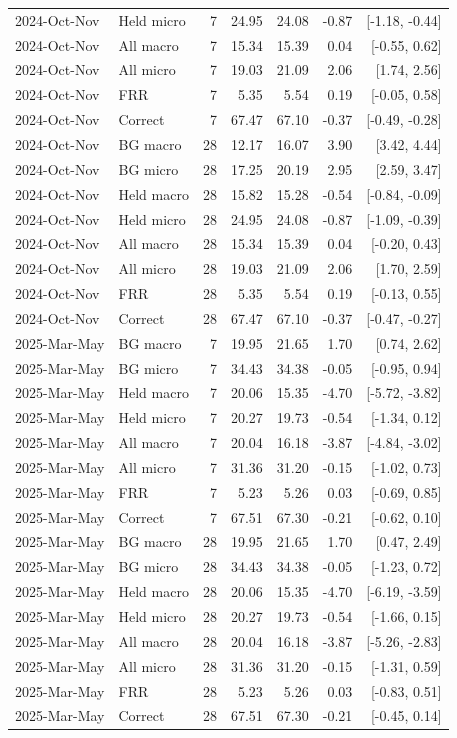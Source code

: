 \begin{longtable}{llrrrrr}
2024-Oct-Nov & Held micro & 7 & 24.95 & 24.08 & -0.87 & [-1.18, -0.44]\\
2024-Oct-Nov & All macro & 7 & 15.34 & 15.39 & 0.04 & [-0.55, 0.62]\\
2024-Oct-Nov & All micro & 7 & 19.03 & 21.09 & 2.06 & [1.74, 2.56]\\
2024-Oct-Nov & FRR & 7 & 5.35 & 5.54 & 0.19 & [-0.05, 0.58]\\
2024-Oct-Nov & Correct & 7 & 67.47 & 67.10 & -0.37 & [-0.49, -0.28]\\
2024-Oct-Nov & BG macro & 28 & 12.17 & 16.07 & 3.90 & [3.42, 4.44]\\
2024-Oct-Nov & BG micro & 28 & 17.25 & 20.19 & 2.95 & [2.59, 3.47]\\
2024-Oct-Nov & Held macro & 28 & 15.82 & 15.28 & -0.54 & [-0.84, -0.09]\\
2024-Oct-Nov & Held micro & 28 & 24.95 & 24.08 & -0.87 & [-1.09, -0.39]\\
2024-Oct-Nov & All macro & 28 & 15.34 & 15.39 & 0.04 & [-0.20, 0.43]\\
2024-Oct-Nov & All micro & 28 & 19.03 & 21.09 & 2.06 & [1.70, 2.59]\\
2024-Oct-Nov & FRR & 28 & 5.35 & 5.54 & 0.19 & [-0.13, 0.55]\\
2024-Oct-Nov & Correct & 28 & 67.47 & 67.10 & -0.37 & [-0.47, -0.27]\\
2025-Mar-May & BG macro & 7 & 19.95 & 21.65 & 1.70 & [0.74, 2.62]\\
2025-Mar-May & BG micro & 7 & 34.43 & 34.38 & -0.05 & [-0.95, 0.94]\\
2025-Mar-May & Held macro & 7 & 20.06 & 15.35 & -4.70 & [-5.72, -3.82]\\
2025-Mar-May & Held micro & 7 & 20.27 & 19.73 & -0.54 & [-1.34, 0.12]\\
2025-Mar-May & All macro & 7 & 20.04 & 16.18 & -3.87 & [-4.84, -3.02]\\
2025-Mar-May & All micro & 7 & 31.36 & 31.20 & -0.15 & [-1.02, 0.73]\\
2025-Mar-May & FRR & 7 & 5.23 & 5.26 & 0.03 & [-0.69, 0.85]\\
2025-Mar-May & Correct & 7 & 67.51 & 67.30 & -0.21 & [-0.62, 0.10]\\
2025-Mar-May & BG macro & 28 & 19.95 & 21.65 & 1.70 & [0.47, 2.49]\\
2025-Mar-May & BG micro & 28 & 34.43 & 34.38 & -0.05 & [-1.23, 0.72]\\
2025-Mar-May & Held macro & 28 & 20.06 & 15.35 & -4.70 & [-6.19, -3.59]\\
2025-Mar-May & Held micro & 28 & 20.27 & 19.73 & -0.54 & [-1.66, 0.15]\\
2025-Mar-May & All macro & 28 & 20.04 & 16.18 & -3.87 & [-5.26, -2.83]\\
2025-Mar-May & All micro & 28 & 31.36 & 31.20 & -0.15 & [-1.31, 0.59]\\
2025-Mar-May & FRR & 28 & 5.23 & 5.26 & 0.03 & [-0.83, 0.51]\\
2025-Mar-May & Correct & 28 & 67.51 & 67.30 & -0.21 & [-0.45, 0.14]\\
\end{longtable}\endgroup
